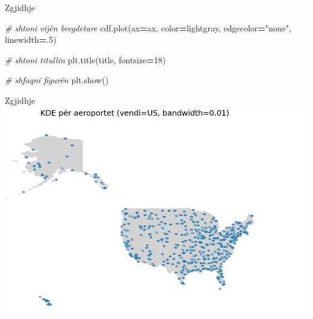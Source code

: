 \documentclass[
  ignorenonframetext,
]{beamer}
\newenvironment{Shaded}{\begin{snugshade}}{\end{snugshade}}
\newcommand{\CommentTok}[1]{\textcolor[rgb]{0.56,0.35,0.01}{\textit{#1}}}
\newcommand{\DecValTok}[1]{\textcolor[rgb]{0.00,0.00,0.81}{#1}}
\newcommand{\FloatTok}[1]{\textcolor[rgb]{0.00,0.00,0.81}{#1}}
\newcommand{\NormalTok}[1]{#1}
\newcommand{\OperatorTok}[1]{\textcolor[rgb]{0.81,0.36,0.00}{\textbf{#1}}}
\newcommand{\StringTok}[1]{\textcolor[rgb]{0.31,0.60,0.02}{#1}}
\begin{document}
\begin{frame}[fragile]{Zgjidhje}
\begin{Shaded}
\begin{Highlighting}[]
        \CommentTok{\# shtoni vijën bregdetare}
\NormalTok{        cdf.plot(ax}\OperatorTok{=}\NormalTok{ax, color}\OperatorTok{=}\StringTok{\textquotesingle{}lightgray\textquotesingle{}}\NormalTok{, edgecolor}\OperatorTok{=}\StringTok{"none"}\NormalTok{, linewidth}\OperatorTok{=}\FloatTok{.5}\NormalTok{)}
        
        \CommentTok{\# shtoni titullin}
\NormalTok{        plt.title(title, fontsize}\OperatorTok{=}\DecValTok{18}\NormalTok{)}
        
        \CommentTok{\# shfaqni figurën}
\NormalTok{        plt.show()}
\end{Highlighting}
\end{Shaded}
\end{frame}

\begin{frame}{Zgjidhje}
\protect\hypertarget{zgjidhje-25}{}
\includegraphics{./Figs/usht7.png}
\end{frame}
\end{document}
